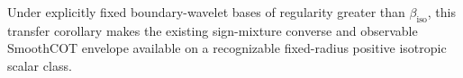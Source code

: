 Under explicitly fixed boundary-wavelet bases of regularity greater than \(\beta_{\mathrm{iso}}\), this transfer corollary makes the existing sign-mixture converse and observable SmoothCOT envelope available on a recognizable fixed-radius positive isotropic scalar class.
